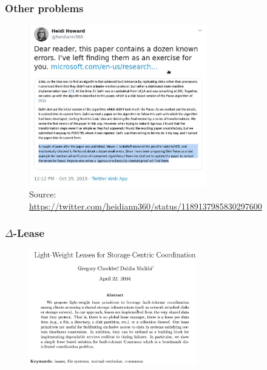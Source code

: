 \documentclass[10pt,utf8]{beamer}
\begin{document}
\begin{frame}
 \frametitle{Other problems}
 \centering
 \begin{figure}
        \centering
        \includegraphics[height=7cm]{./img/howard_disk_paxos.eps}
        \caption{\tiny{Source: \url{https://twitter.com/heidiann360/status/1189137985830297600}}}
    \end{figure}
\end{frame}


\begin{frame}
    \frametitle{$\Delta$-Lease}
    \begin{figure}
        \centering
        \includegraphics[height=5cm]{./img/delta-leases-paper.eps}
    \end{figure}
\end{frame}
\end{document}
